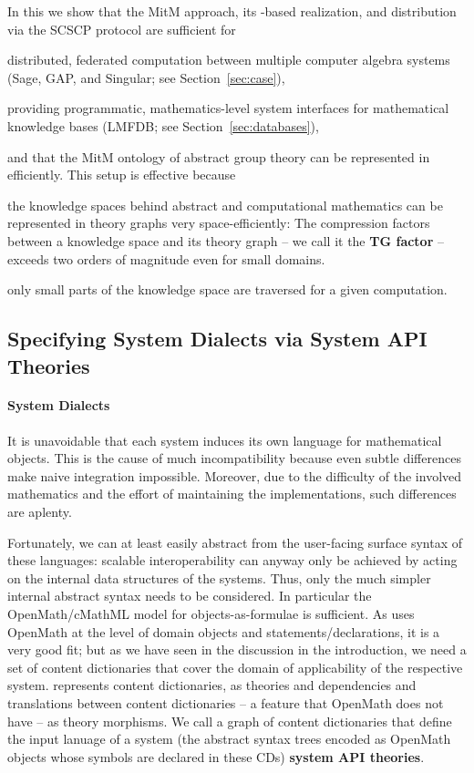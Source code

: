In this \papertype we show that the MitM approach, its \ommt-based realization, and distribution via the SCSCP protocol are sufficient for
\begin{compactitem}
\item distributed, federated computation between multiple computer algebra systems (Sage, GAP, and Singular; see Section~\ref{sec:case}),
\item providing programmatic, mathematics-level system interfaces for mathematical knowledge bases (LMFDB; see Section~\ref{sec:databases}),
\end{compactitem}
and that the MitM ontology of abstract group theory can be represented in \ommt efficiently.
This setup is effective because
\begin{compactitem}
\item the knowledge spaces behind abstract and computational mathematics can be represented in theory graphs very space-efficiently: The compression factors between a knowledge space and its theory graph -- we call it the \textbf{TG factor} -- exceeds two orders of magnitude even for small domains.
\item only small parts of the knowledge space are traversed for a given computation. 
\end{compactitem}

\subsection{Specifying System Dialects via System API Theories}\label{sec:mitm:dialect}

\paragraph{System Dialects}
It is unavoidable that each system induces its own language for mathematical objects.
This is the cause of much incompatibility because even subtle differences make naive integration impossible.
Moreover, due to the difficulty of the involved mathematics and the effort of maintaining the implementations, such differences are aplenty.

Fortunately, we can at least easily abstract from the user-facing surface syntax of these languages: scalable interoperability can anyway only be achieved by acting on the internal data structures of the systems.
Thus, only the much simpler internal abstract syntax needs to be considered.
In particular the OpenMath/cMathML model for objects-as-formulae is sufficient.
As \ommt uses OpenMath at the level of domain objects and statements/declarations, it is a very good fit; but as we have seen in the discussion in the introduction, we need a set of content dictionaries that cover the domain of applicability of the respective system.
\ommt represents content dictionaries,  as theories and dependencies and translations between content dictionaries -- a feature that OpenMath does not have -- as theory morphisms.
We call a graph of \ommt content dictionaries that define the input lanuage of a system (the abstract syntax trees encoded as OpenMath objects whose symbols are declared in these CDs) \textbf{system API theories}. 


